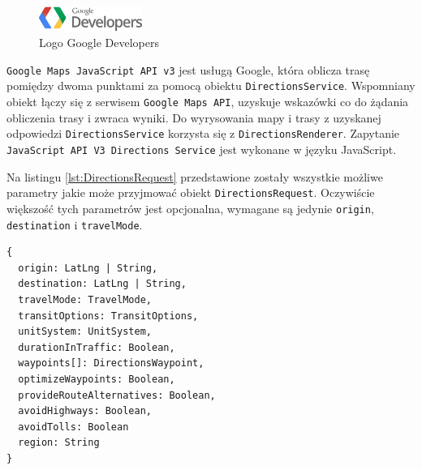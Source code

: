 \documentclass[eng,printmode,oneside]{mgr}
\begin{document}
\begin{figure}
\centering
\vspace{-15pt}
\includegraphics[width=0.3\textwidth]{googlelogo.png}
\caption{Logo Google Developers \cite{developer.google}}
\label{fig:googlelogo}
\vspace{-10pt}
\end{figure}

\texttt{Google Maps JavaScript API v3} jest usługą Google, która oblicza trasę
pomiędzy dwoma punktami za pomocą obiektu \texttt{DirectionsService}.
Wspomniany obiekt łączy się z serwisem \texttt{Google Maps API}, uzyskuje
wskazówki co do żądania obliczenia trasy i zwraca wyniki. Do wyrysowania mapy i
trasy z uzyskanej odpowiedzi \texttt{DirectionsService} korzysta się z
\texttt{DirectionsRenderer}. Zapytanie \texttt{JavaScript API V3 Directions
Service} jest wykonane w języku JavaScript.

Na listingu \ref{lst:DirectionsRequest} przedstawione zostały wszystkie możliwe
parametry jakie może przyjmować obiekt \texttt{DirectionsRequest}. Oczywiście
większość tych parametrów jest opcjonalna, wymagane są jedynie \texttt{origin},
\texttt{destination} i \texttt{travelMode}.

\begin{lstlisting}[caption=Parametry jakie może
przyjmować obiekt typu \texttt{DirectionsRequest},label=lst:DirectionsRequest] 
{
  origin: LatLng | String,
  destination: LatLng | String,
  travelMode: TravelMode,
  transitOptions: TransitOptions,
  unitSystem: UnitSystem,
  durationInTraffic: Boolean,
  waypoints[]: DirectionsWaypoint,
  optimizeWaypoints: Boolean,
  provideRouteAlternatives: Boolean,
  avoidHighways: Boolean,
  avoidTolls: Boolean
  region: String
}
\end{lstlisting}
\end{document}
